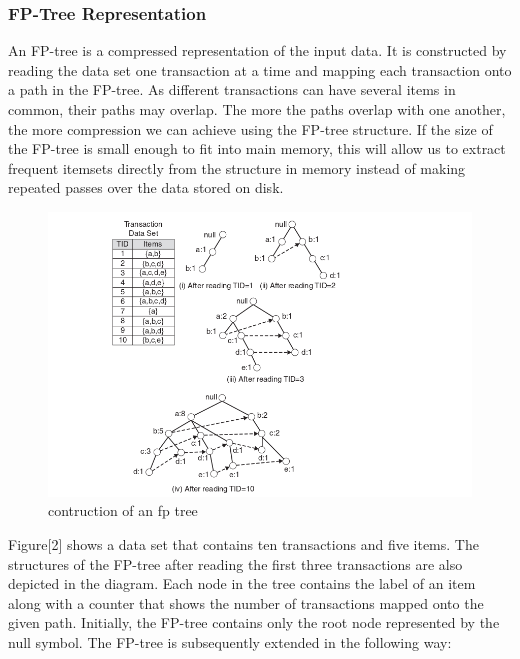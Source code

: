 \documentclass{article}\usepackage[]{graphicx}\usepackage[]{color}
\begin{document}
\subsubsection{FP-Tree Representation}\hspace{0.9cm}An FP-tree is a compressed representation of the input data. It is constructed by reading the data set one transaction at a time and mapping each transaction onto a path in the FP-tree.  As different transactions can have several items in common, their paths may overlap. The more the paths overlap with one another, the more compression we can achieve using the FP-tree structure. If
the size of the FP-tree is small enough to fit into main memory, this will allow us to extract frequent itemsets directly from the structure in memory instead of making repeated passes over the data stored on disk.\par
\begin{figure}[h]
\begin{center}
\includegraphics [scale=0.60]{fpeg.png}
\end{center}
\caption{contruction of an fp tree}
\end{figure}
\hspace{0.5cm}Figure[2] shows a data set that contains ten transactions and five items. The structures of the FP-tree after reading the first three transactions are also depicted in the diagram. Each node in the tree contains the label of an item along with a counter that shows the number of transactions mapped onto the given path. Initially, the FP-tree contains only the root node represented by the null symbol. The FP-tree is subsequently extended in the following way:
\end{document}
